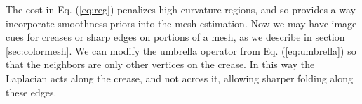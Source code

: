 The cost in Eq. (\ref{eq:reg}) penalizes high curvature regions, and so provides a way incorporate smoothness priors into the mesh estimation.  Now we may have image cues for creases or sharp edges on portions of a mesh, as we describe in section \ref{sec:colormesh}.  We can modify the umbrella operator from Eq. (\ref{eq:umbrella}) so that the neighbors are only other vertices on the crease.  In this way the Laplacian acts along the crease, and not across it, allowing sharper folding along these edges.
 
 
 